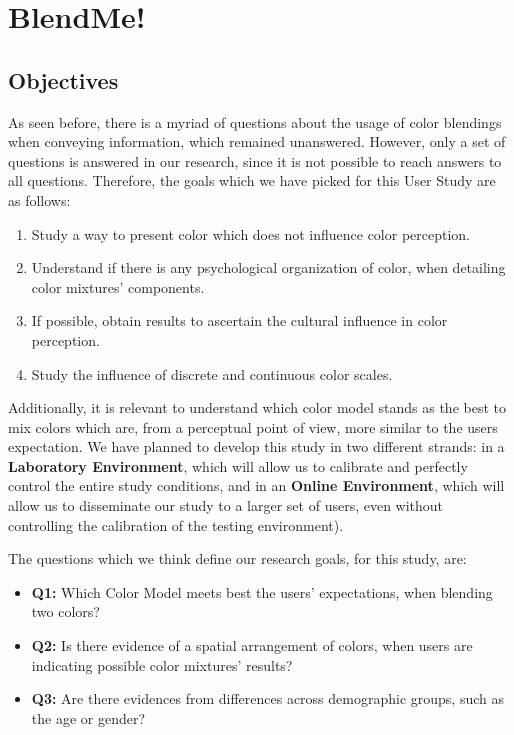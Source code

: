 
\chapter{BlendMe!}
\label{chapter:design}

\section{Objectives}
\label{sec:impl_objectives}
%
As seen before, there is a myriad of questions about the usage of color blendings when conveying information, which remained unanswered. However, only a set of questions
is answered in our research, since it is not possible to reach answers to all questions. Therefore, the goals which we have picked for this User Study are as follows:
%
\begin{enumerate}
	\item Study a way to present color which does not influence color perception.
  \item Understand if there is any psychological organization of color, when detailing color mixtures' components.
  \item If possible, obtain results to ascertain the cultural influence in color perception.
  \item Study the influence of discrete and continuous color scales.
\end{enumerate}
%
Additionally, it is relevant to understand which color model stands as the best to mix colors which are, from a perceptual point of view, more similar to the users expectation.
We have planned to develop this study in two different strands: in a \textbf{Laboratory Environment}, which will allow us to calibrate and perfectly control the entire study conditions,
and in an \textbf{Online Environment}, which will allow us to disseminate our study to a larger set of users, even without controlling the calibration of the testing environment). \par
%
The questions which we think define our research goals, for this study, are:
%
\begin{itemize}
	\item \textbf{Q1:} Which Color Model meets best the users' expectations, when blending two colors?
	\item \textbf{Q2:} Is there evidence of a spatial arrangement of colors, when users are indicating possible color mixtures' results?
	\item \textbf{Q3:} Are there evidences from differences across demographic groups, such as the age or gender?
\end{itemize}
